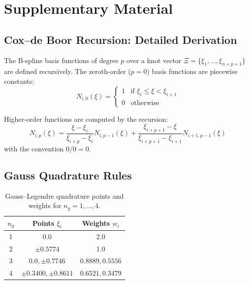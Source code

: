 \chapter{Supplementary Material}
\label{app:supplementary}

\section{Cox--de Boor Recursion: Detailed Derivation}

The B-spline basis functions of degree $p$ over a knot vector $\Xi = \{\xi_1, \ldots, \xi_{n+p+1}\}$ are defined recursively. The zeroth-order ($p=0$) basis functions are piecewise constants:
\begin{equation}
    N_{i,0}(\xi) = \begin{cases} 1 & \text{if } \xi_i \leq \xi < \xi_{i+1} \\ 0 & \text{otherwise} \end{cases}
\end{equation}

Higher-order functions are computed by the recursion:
\begin{equation}
    N_{i,p}(\xi) = \frac{\xi - \xi_i}{\xi_{i+p} - \xi_i} N_{i,p-1}(\xi) + \frac{\xi_{i+p+1} - \xi}{\xi_{i+p+1} - \xi_{i+1}} N_{i+1,p-1}(\xi)
\end{equation}
with the convention $0/0 = 0$.

\section{Gauss Quadrature Rules}

\begin{table}[H]
\centering
\caption{Gauss--Legendre quadrature points and weights for $n_g = 1, \ldots, 4$.}
\begin{tabular}{ccc}
\toprule
$n_g$ & Points $\xi_i$ & Weights $w_i$ \\
\midrule
1 & 0.0 & 2.0 \\
2 & $\pm 0.5774$ & 1.0 \\
3 & $0.0, \pm 0.7746$ & $0.8889, 0.5556$ \\
4 & $\pm 0.3400, \pm 0.8611$ & $0.6521, 0.3479$ \\
\bottomrule
\end{tabular}
\end{table}

